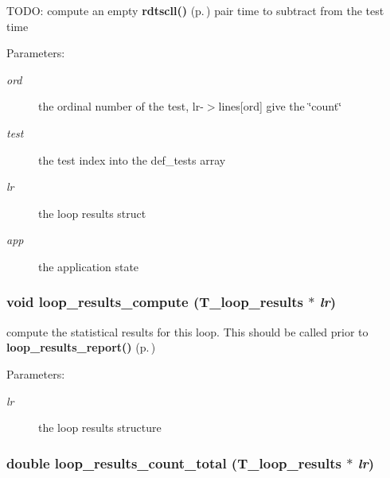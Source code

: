 TODO: compute an empty {\bf rdtscll()} {\rm (p.\,\pageref{rdtsc_8h_a1})} pair time to subtract from the test time\begin{Desc}
\item[Parameters: ]\par
\begin{description}
\item[{\em 
ord}]the ordinal number of the test, lr-$>$lines[ord] give the \char`\"{}count\char`\"{} \item[{\em 
test}]the test index into the def\_\-tests array \item[{\em 
lr}]the loop results struct \item[{\em 
app}]the application state \end{description}
\end{Desc}
\subsubsection{\setlength{\rightskip}{0pt plus 5cm}void loop\_\-results\_\-compute ({\bf T\_\-loop\_\-results} $\ast$ {\em lr})}\label{group__loop__test_a7}


compute the statistical results for this loop. This should be called prior to {\bf loop\_\-results\_\-report()} {\rm (p.\,\pageref{group__loop__test_a19})}

\begin{Desc}
\item[Parameters: ]\par
\begin{description}
\item[{\em 
lr}]the loop results structure \end{description}
\end{Desc}
\subsubsection{\setlength{\rightskip}{0pt plus 5cm}double loop\_\-results\_\-count\_\-total ({\bf T\_\-loop\_\-results} $\ast$ {\em lr})}\label{group__loop__test_a16}


